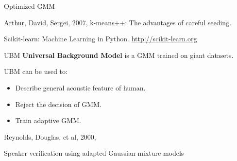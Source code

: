\begin{frame}{Optimized GMM}
  \begin{reference}{4mm}{85mm}
    Arthur, David, Sergei, 2007,
    k-means++: The advantages of careful seeding.

    Scikit-learn: Machine Learning in {P}ython. \url{http://scikit-learn.org}
  \end{reference}
\end{frame}

\begin{frame}{UBM}
  \textbf{Universal Background Model} is a GMM trained on giant datasets.

  UBM can be used to:
  \begin{itemize}
    \item Describe general acoustic feature of human.
    \item Reject the decision of GMM.
    \item Train adaptive GMM.
  \end{itemize}

  \begin{reference}{4mm}{85mm}
    Reynolds, Douglas, et al, 2000,

    Speaker verification using adapted Gaussian mixture models
  \end{reference}
\end{frame}


